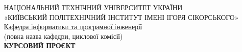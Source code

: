 \documentclass[14pt]{article}
\begin{document}
\fontsize{14}{17}\selectfont

\begin{center}
НАЦІОНАЛЬНИЙ ТЕХНІЧНИЙ УНІВЕРСИТЕТ УКРАЇНИ\\
«КИЇВСЬКИЙ ПОЛІТЕХНІЧНИЙ ІНСТИТУТ ІМЕНІ ІГОРЯ СІКОРСЬКОГО»\\

\fontsize{12}{14}\selectfont
\underline{Кафедра інформатики та програмної інженерії}\\

\fontsize{8}{10}\selectfont
(повна назва кафедри, циклової комісії)\\

\fontsize{18}{22}\selectfont
\textbf{КУРСОВИЙ ПРОЄКТ}
\end{center}

\thispagestyle{empty}
\end{document}
